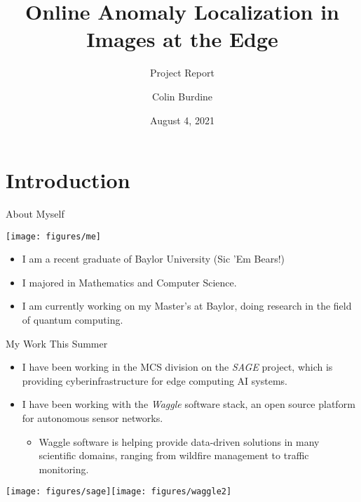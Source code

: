 \documentclass[10pt,handout]{beamer}
\title{Online Anomaly Localization in Images at the Edge}
\subtitle{Project Report}
\date{August 4, 2021}
\author{Colin Burdine}
\institute{SULI Intern $|$ Argonne National Laboratory \\[2mm] Learning Off The Lawn 2021}
\begin{document}
\maketitle


\section{Introduction}

\begin{frame}{About Myself}
\begin{center}
\texttt{[image: figures/me]}
\end{center}
\begin{itemize}
\item I am a recent graduate of Baylor University (Sic 'Em Bears!)
\item I majored in Mathematics and Computer Science.
\item I am currently working on my Master's at Baylor, doing research in the field of quantum computing.
\end{itemize}
\end{frame}

\begin{frame}{My Work This Summer}
\begin{itemize}
\item I have been working in the MCS division on the \textit{SAGE} project, which is providing cyberinfrastructure for edge computing AI systems.

\item I have been working with the \textit{Waggle} software stack,  an open source platform for autonomous sensor networks.\\[2mm]

\begin{itemize}
\item Waggle software is helping provide data-driven solutions in many scientific domains, ranging from wildfire management to traffic monitoring.
\end{itemize}
\end{itemize}
\begin{center}
\texttt{[image: figures/sage]}\texttt{[image: figures/waggle2]}
\end{center}
\end{frame}
\end{document}
